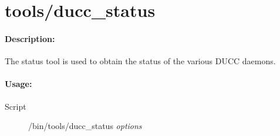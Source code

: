 % 
% 
% 
% 
\ifpdf
\else
{}
\fi
    \section{tools/ducc\_status}
    \label{sec:cli.tools-ducc-status}    

  \paragraph{Description:}
    The status tool is used to obtain the status of the various DUCC daemons. 
    
  \paragraph{Usage:}
    \begin{description}
    \item[Script] \ducchome/bin/tools/ducc\_status {\em options}
    \end{description}
    
